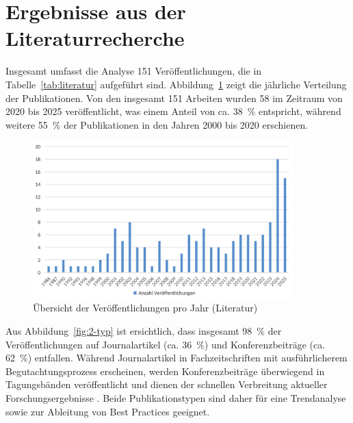 \section{Ergebnisse aus der Literaturrecherche}\label{chap:results_lit}

Insgesamt umfasst die Analyse 151 Veröffentlichungen, die in Tabelle~\ref{tab:literatur} aufgeführt sind. Abbildung~\ref{fig:1-veroeffentlichungen-jahr} zeigt die jährliche Verteilung der Publikationen. Von den insgesamt 151 Arbeiten wurden 58 im Zeitraum von 2020 bis 2025 veröffentlicht, was einem Anteil von ca. 38~\% entspricht, während weitere 55~\% der Publikationen in den Jahren 2000 bis 2020 erschienen.

\begin{figure}[!htbp]
    \centering
    \includegraphics[width=0.90\textwidth]{graphics_lit/1-veroeffentlichungen-jahr.png}
    \caption{Übersicht der Veröffentlichungen pro Jahr (Literatur)}
    \label{fig:1-veroeffentlichungen-jahr}
\end{figure}

Aus Abbildung~\ref{fig:2-typ} ist ersichtlich, dass insgesamt 98~\% der Veröffentlichungen auf Journalartikel (ca. 36~\%) und Konferenzbeiträge (ca. 62~\%) entfallen. Während Journalartikel in Fachzeitschriften mit ausführlicherem Begutachtungsprozess erscheinen, werden Konferenzbeiträge überwiegend in Tagungsbänden veröffentlicht und dienen der schnellen Verbreitung aktueller Forschungsergebnisse \cite{abbadia_conference_2022}. Beide Publikationstypen sind daher für eine Trendanalyse sowie zur Ableitung von Best Practices geeignet.

